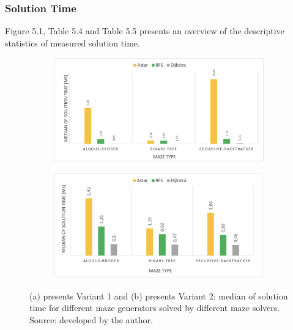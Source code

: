 \subsubsection{Solution Time}
Figure 5.1, Table 5.4 and Table 5.5 presents an overview of the descriptive statistics of measured solution time.\\
\begin{figure}[!h]
    \centering
    \begin{subfigure}[b]{0.7\textwidth}
        \centering
        \includegraphics[width=\textwidth]{averagetime.png}
        \caption{}
    \end{subfigure}
    \begin{subfigure}[b]{0.7\textwidth}  
        \centering 
        \includegraphics[width=\textwidth]{averagetime_variant2.png}
        \caption{}
    \end{subfigure}
    \caption[]{(a) presents Variant 1 and (b) presents Variant 2: median of solution time for different maze generators solved by different maze solvers.\\Source: developed by the author.}
\end{figure}
